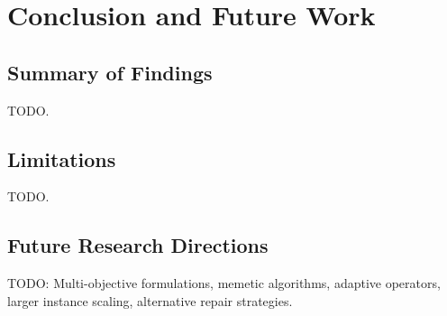 \chapter{Conclusion and Future Work}
\label{Chapter7}

\section{Summary of Findings}
\label{Sec:Summary}
TODO.

\section{Limitations}
\label{Sec:Limitations}
TODO.

\section{Future Research Directions}
\label{Sec:FutureWork}
TODO: Multi-objective formulations, memetic algorithms, adaptive operators, larger instance scaling, alternative repair strategies.
